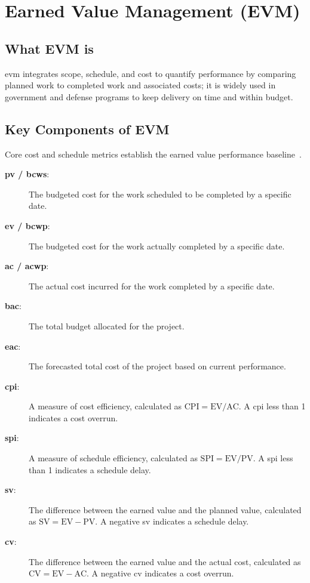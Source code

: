 \documentclass[../main.tex]{subfiles}
\begin{document}

\section{Earned Value Management (EVM)}

\subsection{What EVM is}

\ac{evm} integrates scope, schedule, and cost to quantify performance by comparing planned work to completed work and associated costs; it is widely used in government and defense programs to keep delivery on time and within budget.

\subsection{Key Components of EVM}
Core cost and schedule metrics establish the earned value performance baseline~\autocite{edo-3-6-1-evm-intro-2025, edo-3-6-2-evm-analysis-2025}.
\begin{description}
  \item [\textbf{\ac{pv} / \ac{bcws}}:] The budgeted cost for the work scheduled to be completed by a specific date.
  \item [\textbf{\ac{ev} / \ac{bcwp}}:] The budgeted cost for the work actually completed by a specific date.
  \item [\textbf{\ac{ac} / \ac{acwp}}:] The actual cost incurred for the work completed by a specific date.
  \item [\textbf{\ac{bac}}:] The total budget allocated for the project.
  \item [\textbf{\ac{eac}}:] The forecasted total cost of the project based on current performance.
  \item [\textbf{\ac{cpi}}:] A measure of cost efficiency, calculated as $\text{CPI} = \text{EV} / \text{AC}$. A \ac{cpi} less than 1 indicates a cost overrun.
  \item [\textbf{\ac{spi}}:] A measure of schedule efficiency, calculated as $\text{SPI} = \text{EV} / \text{PV}$. A \ac{spi} less than 1 indicates a schedule delay.
  \item [\textbf{\ac{sv}}:] The difference between the earned value and the planned value, calculated as $\text{SV} = \text{EV} - \text{PV}$. A negative \ac{sv} indicates a schedule delay.
  \item [\textbf{\ac{cv}}:] The difference between the earned value and the actual cost, calculated as $\text{CV} = \text{EV} - \text{AC}$. A negative \ac{cv} indicates a cost overrun.
\end{description}
\end{document}
